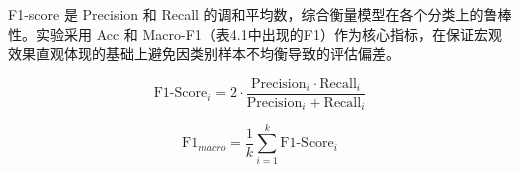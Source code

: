 F1-score 是 Precision 和 Recall 的调和平均数，综合衡量模型在各个分类上的鲁棒性。实验采用 Acc 和 Macro-F1（表4.1中出现的F1）作为核心指标，在保证宏观效果直观体现的基础上避免因类别样本不均衡导致的评估偏差。

\begin{equation}
    \mathrm{F1\text{-}Score}_{i} = 2 \cdot \frac{\mathrm{Precision}_{i} \cdot \mathrm{Recall}_{i}}{\mathrm{Precision}_{i} + \mathrm{Recall}_{i}}
\end{equation}

\begin{equation}
    \mathrm{F1}_{macro} = \frac{1}{k}\sum_{i=1}^{k}\mathrm{F1\text{-}Score}_{i}
\end{equation}

